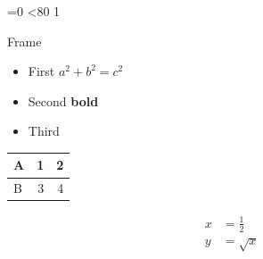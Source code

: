 \documentclass{beamer}\usetheme{Madrid}\usepackage{amsmath,booktabs}
\begin{document}
=0
\loop\ifnum{}<80 \advance{} 1
\begin{frame}{Frame \the{}}\begin{itemize}\item First $a^2+b^2=c^2$\item Second \textbf{bold}\pause\item Third\end{itemize}
\begin{tabular}{lrr}\toprule A&1&2\\\midrule B&3&4\\\bottomrule\end{tabular}
\begin{align}x&=\frac{1}{2}\\ y&=\sqrt{x}\end{align}\end{frame}
\repeat
\end{document}
